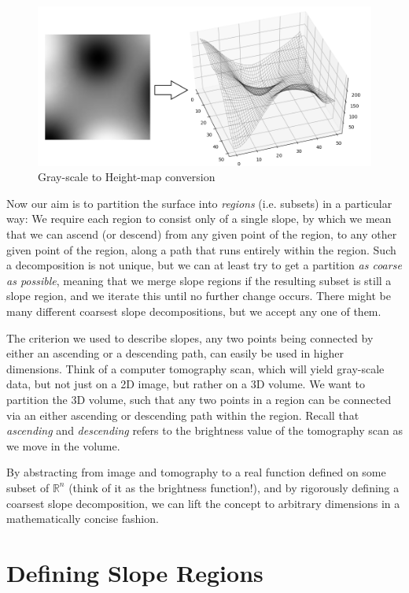 \documentclass[a4paper,12pt,notitlepage,fullpage]{paper}
\theoremstyle{plain}
\theoremstyle{definition}
\begin{document}
\begin{figure}[h]
\includegraphics[width=\textwidth]{img/visu1.png}
\caption{Gray-scale to Height-map conversion}
\label{fig:conversion}
\end{figure}

Now our aim is to partition the surface into \emph{regions} (i.e. subsets) in a particular way: We require each region to consist only of a single slope, by which we mean that we can ascend (or descend) from any given point of the region, to any other given point of the region, along a path that runs entirely within the region. Such a decomposition is not unique, but we can at least try to get a partition \emph{as coarse as possible}, meaning that we merge slope regions if the resulting subset is still a slope region, and we iterate this until no further change occurs. There might be many different coarsest slope decompositions, but we accept any one of them.

The criterion we used to describe slopes, any two points being connected by either an ascending or a descending path, can easily be used in higher dimensions. Think of a computer tomography scan, which will yield gray-scale data, but not just on a 2D image, but rather on a 3D volume.
We want to partition the 3D volume, such that any two points in a region can be connected via an either ascending or descending path within the region. Recall that \emph{ascending} and \emph{descending} refers to the brightness value of the tomography scan as we move in the volume.

By abstracting from image and tomography to a real function defined on some subset of $\mathbb{R}^n$ (think of it as the brightness function!), and by rigorously defining a coarsest slope decomposition, we can lift the concept to arbitrary dimensions in a mathematically concise fashion.

\section{Defining Slope Regions}
\label{sec:definitions}
\end{document}
